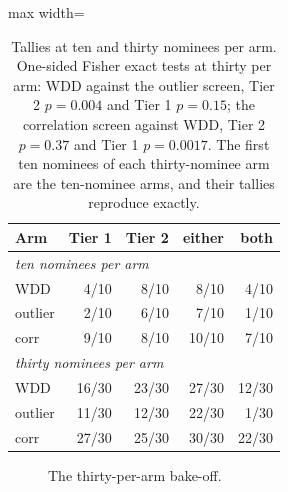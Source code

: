 \begin{table}[H]\centering\small
\caption{Tallies at ten and thirty nominees per arm. One-sided Fisher exact tests at thirty per arm: WDD against the outlier screen, Tier 2 $p=0.004$ and Tier 1 $p=0.15$; the correlation screen against WDD, Tier 2 $p=0.37$ and Tier 1 $p=0.0017$. The first ten nominees of each thirty-nominee arm are the ten-nominee arms, and their tallies reproduce exactly.}\label{app:tallies}
\begin{adjustbox}{max width=\linewidth}
\begin{tabular}{lrrrr}\toprule
Arm & Tier 1 & Tier 2 & either & both \\ \midrule
\multicolumn{5}{l}{\emph{ten nominees per arm}} \\
WDD & 4/10 & 8/10 & 8/10 & 4/10 \\
outlier & 2/10 & 6/10 & 7/10 & 1/10 \\
corr & 9/10 & 8/10 & 10/10 & 7/10 \\
\multicolumn{5}{l}{\emph{thirty nominees per arm}} \\
WDD & 16/30 & 23/30 & 27/30 & 12/30 \\
outlier & 11/30 & 12/30 & 22/30 & 1/30 \\
corr & 27/30 & 25/30 & 30/30 & 22/30 \\
\bottomrule\end{tabular}\end{adjustbox}
\end{table}
\begin{figure}[H]\centering{}\caption{The thirty-per-arm bake-off.}\label{app:bakefig}\end{figure}
